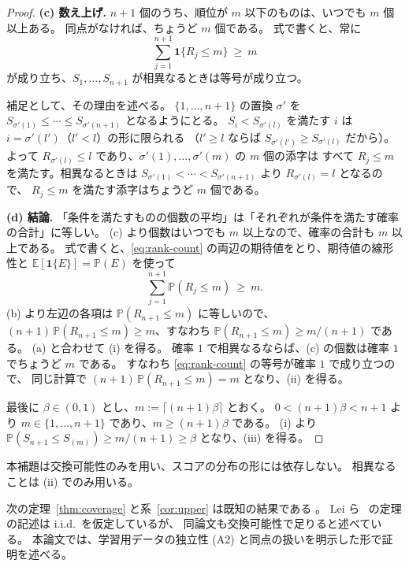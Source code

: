 \documentclass[a4paper,11pt]{jsarticle}
\theoremstyle{definition}
\theoremstyle{plain}
\theoremstyle{remark}
\newcommand{\Prob}{\mathbb{P}}
\newcommand{\Exp}{\mathbb{E}}
\newcommand{\Ind}{\mathbf{1}}                  %
\begin{document}
\begin{proof}
  \textbf{(c) 数え上げ.}
  $n+1$ 個のうち、順位が $m$ 以下のものは、いつでも $m$ 個以上ある。
  同点がなければ、ちょうど $m$ 個である。
  式で書くと、常に
  \begin{equation}
    \label{eq:rank-count}
    \sum_{j=1}^{n+1}\Ind\{R_j\le m\}\ \ge\ m
  \end{equation}
  が成り立ち、$S_1,\dots,S_{n+1}$ が相異なるときは等号が成り立つ。

  補足として、その理由を述べる。
  $\{1,\dots,n+1\}$ の置換 $\sigma'$ を
  $S_{\sigma'(1)}\le\cdots\le S_{\sigma'(n+1)}$ となるようにとる。
  $S_i<S_{\sigma'(l)}$ を満たす $i$ は $i=\sigma'(l')$（$l'<l$）の形に限られる
  （$l'\ge l$ ならば $S_{\sigma'(l')}\ge S_{\sigma'(l)}$ だから）。
  よって $R_{\sigma'(l)}\le l$ であり、$\sigma'(1),\dots,\sigma'(m)$ の $m$ 個の添字は
  すべて $R_j\le m$ を満たす。相異なるときは
  $S_{\sigma'(1)}<\cdots<S_{\sigma'(n+1)}$ より $R_{\sigma'(l)}=l$ となるので、
  $R_j\le m$ を満たす添字はちょうど $m$ 個である。

  \textbf{(d) 結論.}
  「条件を満たすものの個数の平均」は「それぞれが条件を満たす確率の合計」に等しい。
  (c) より個数はいつでも $m$ 以上なので、確率の合計も $m$ 以上である。
  式で書くと、\eqref{eq:rank-count} の両辺の期待値をとり、期待値の線形性と
  $\Exp[\Ind\{E\}]=\Prob(E)$ を使って
  \begin{equation*}
    \sum_{j=1}^{n+1}\Prob(R_j\le m)\ \ge\ m.
  \end{equation*}
  (b) より左辺の各項は $\Prob(R_{n+1}\le m)$ に等しいので、
  $(n+1)\,\Prob(R_{n+1}\le m)\ge m$、すなわち $\Prob(R_{n+1}\le m)\ge m/(n+1)$ である。
  (a) と合わせて (i) を得る。
  確率 $1$ で相異なるならば、(c) の個数は確率 $1$ でちょうど $m$ である。
  すなわち \eqref{eq:rank-count} の等号が確率 $1$ で成り立つので、
  同じ計算で $(n+1)\,\Prob(R_{n+1}\le m)=m$ となり、(ii) を得る。

  最後に $\beta\in(0,1)$ とし、$m:=\lceil(n+1)\beta\rceil$ とおく。
  $0<(n+1)\beta<n+1$ より $m\in\{1,\dots,n+1\}$ であり、$m\ge(n+1)\beta$ である。
  (i) より $\Prob(S_{n+1}\le S_{(m)})\ge m/(n+1)\ge\beta$ となり、(iii) を得る。
\end{proof}

本補題は交換可能性のみを用い、スコアの分布の形には依存しない。
相異なることは (ii) でのみ用いる。

次の定理~\ref{thm:coverage} と系~\ref{cor:upper} は既知の結果である
\cite{vovk2005algorithmic,lei2018distribution,angelopoulos2023conformal}。
Lei ら~\cite{lei2018distribution} の定理の記述は i.i.d.\ を仮定しているが、
同論文も交換可能性で足りると述べている。
本論文では、学習用データの独立性 (A2) と同点の扱いを明示した形で証明を述べる。
\end{document}
